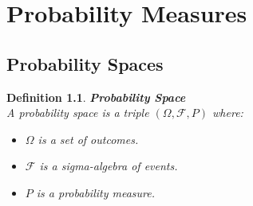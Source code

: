 \documentclass[11pt]{book}
\newtheorem{definition}{Definition}[section]
\begin{document}

 
\chapter{Probability Measures}

\section{Probability Spaces}

\begin{definition}{\textbf{Probability Space}} \\
    A probability space is a triple \( (\Omega, \mathcal{F}, P) \) where:
    \begin{itemize}
        \item \( \Omega \) is a set of outcomes.
        \item \( \mathcal{F} \) is a sigma-algebra of events.
        \item \( P \) is a probability measure.
    \end{itemize}
\end{definition}
\end{document}
